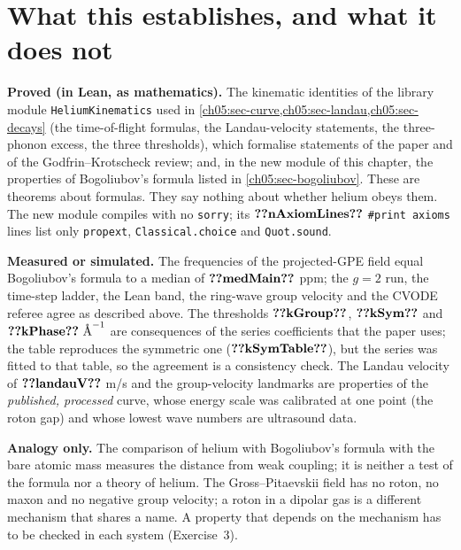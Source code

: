 \section{What this establishes, and what it does not}\label{ch05:sec-honest}

\begin{honestbox}
\textbf{Proved (in Lean, as mathematics).}
The kinematic identities of the library module \texttt{HeliumKinematics} used in \cref{ch05:sec-curve,ch05:sec-landau,ch05:sec-decays} (the time-of-flight formulas, the Landau-velocity statements, the three-phonon excess, the three thresholds), which formalise statements of the paper and of the Godfrin--Krotscheck review; and, in the new module of this chapter, the properties of Bogoliubov's formula listed in \cref{ch05:sec-bogoliubov}.
These are theorems about formulas.
They say nothing about whether helium obeys them.
The new module compiles with no \texttt{sorry}; its $\cfiveV{nAxiomLines}$ \texttt{\#print axioms} lines list only \texttt{propext}, \texttt{Classical.choice} and \texttt{Quot.sound}.\par\vspace{3pt}
\textbf{Measured or simulated.}
The  frequencies of the projected-GPE field equal Bogoliubov's formula to a median of $\cfiveV{medMain}$ ppm; the $g=2$ run, the time-step ladder, the Lean band, the ring-wave group velocity and the CVODE referee agree as described above.
The thresholds $\cfiveV{kGroup}$, $\cfiveV{kSym}$ and $\cfiveV{kPhase}\ \cfiveAng^{-1}$ are consequences of the series coefficients that the paper uses; the table reproduces the symmetric one ($\cfiveV{kSymTable}$), but the series was fitted to that table, so the agreement is a consistency check.
The Landau velocity of $\cfiveV{landauV}$ m/s and the group-velocity landmarks are properties of the \emph{published, processed} curve, whose energy scale was calibrated at one point (the roton gap) and whose lowest wave numbers are ultrasound data.\par\vspace{3pt}
\textbf{Analogy only.}
The comparison of helium with Bogoliubov's formula with the bare atomic mass measures the distance from weak coupling; it is neither a test of the formula nor a theory of helium.
The Gross--Pitaevskii field has no roton, no maxon and no negative group velocity; a roton in a dipolar gas is a different mechanism that shares a name.
A property that depends on the mechanism has to be checked in each system (Exercise~3).\par\vspace{3pt}

\end{honestbox}
